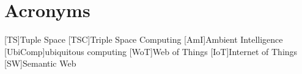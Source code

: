 


\chapter*{Acronyms}

\begin{acronym}
  [TS]{Tuple Space}
  [TSC]{Triple Space Computing}
  [AmI]{Ambient Intelligence}
  [UbiComp]{ubiquitous computing}
  [WoT]{Web of Things}
  [IoT]{Internet of Things}
  [SW]{Semantic Web}
\end{acronym}



